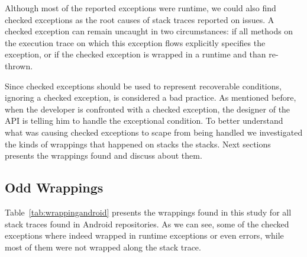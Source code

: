 \documentclass[conference]{IEEEtran}
\begin{document}
Although most of the  reported exceptions were runtime, we could also find checked
exceptions as the root causes of stack traces reported on issues. A checked exception
can remain uncaught in two circumstances: if all methods on the execution trace
on which this exception flows explicitly specifies the exception, or if the
checked exception is wrapped in a runtime and than re-thrown. 

Since checked exceptions should be used to represent recoverable conditions, ignoring a
checked exception, is considered a bad practice. As mentioned before, when the developer is confronted
with a checked exception, the designer of the API is telling him to handle the
exceptional condition. To better understand what was causing checked exceptions
to scape from being handled we investigated the kinds of wrappings that happened
on stacks the stacks.  Next sections presents the wrappings found and discuss
about them.

\subsection{Odd Wrappings}
Table~\ref{tab:wrappingandroid} presents the wrappings found in this study for all
stack traces found in Android repositories. As we can see, some of the checked
exceptions where indeed wrapped in runtime exceptions or even errors, while most
of them were not wrapped along the stack trace. 
\end{document}
